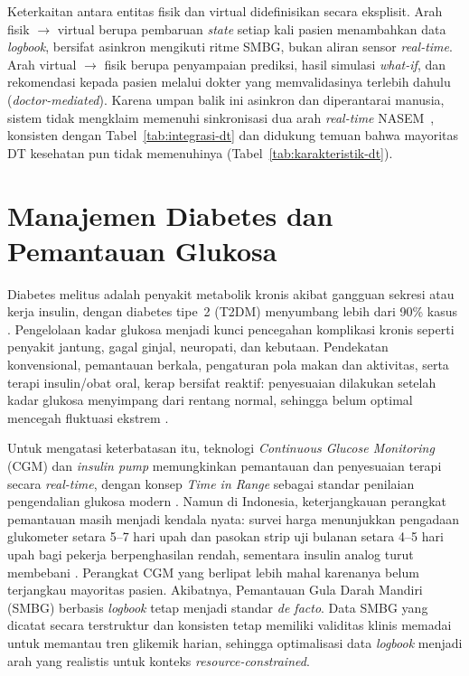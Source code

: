Keterkaitan antara entitas fisik dan virtual didefinisikan secara eksplisit. Arah fisik $\rightarrow$ virtual berupa pembaruan \emph{state} setiap kali pasien menambahkan data \emph{logbook}, bersifat asinkron mengikuti ritme SMBG, bukan aliran sensor \emph{real-time}. Arah virtual $\rightarrow$ fisik berupa penyampaian prediksi, hasil simulasi \emph{what-if}, dan rekomendasi kepada pasien melalui dokter yang memvalidasinya terlebih dahulu (\emph{doctor-mediated}). Karena umpan balik ini asinkron dan diperantarai manusia, sistem tidak mengklaim memenuhi sinkronisasi dua arah \emph{real-time} NASEM~\autocite{nasem2024}, konsisten dengan Tabel~\ref{tab:integrasi-dt} dan didukung temuan bahwa mayoritas DT kesehatan pun tidak memenuhinya (Tabel~\ref{tab:karakteristik-dt}).

\section{Manajemen Diabetes dan Pemantauan Glukosa}
Diabetes melitus adalah penyakit metabolik kronis akibat gangguan sekresi atau kerja insulin, dengan diabetes tipe~2 (T2DM) menyumbang lebih dari 90\% kasus \autocite{who2023}. Pengelolaan kadar glukosa menjadi kunci pencegahan komplikasi kronis seperti penyakit jantung, gagal ginjal, neuropati, dan kebutaan. Pendekatan konvensional, pemantauan berkala, pengaturan pola makan dan aktivitas, serta terapi insulin/obat oral, kerap bersifat reaktif: penyesuaian dilakukan setelah kadar glukosa menyimpang dari rentang normal, sehingga belum optimal mencegah fluktuasi ekstrem \autocite{alkaff2021}.

Untuk mengatasi keterbatasan itu, teknologi \emph{Continuous Glucose Monitoring} (CGM) dan \emph{insulin pump} memungkinkan pemantauan dan penyesuaian terapi secara \emph{real-time}, dengan konsep \emph{Time in Range} sebagai standar penilaian pengendalian glukosa modern \autocite{battelino2019}. Namun di Indonesia, keterjangkauan perangkat pemantauan masih menjadi kendala nyata: survei harga menunjukkan pengadaan glukometer setara 5--7 hari upah dan pasokan strip uji bulanan setara 4--5 hari upah bagi pekerja berpenghasilan rendah, sementara insulin analog turut membebani \autocite{ramadaniati2024}. Perangkat CGM yang berlipat lebih mahal karenanya belum terjangkau mayoritas pasien. Akibatnya, Pemantauan Gula Darah Mandiri (SMBG) berbasis \emph{logbook} tetap menjadi standar \emph{de facto}. Data SMBG yang dicatat secara terstruktur dan konsisten tetap memiliki validitas klinis memadai untuk memantau tren glikemik harian, sehingga optimalisasi data \emph{logbook} menjadi arah yang realistis untuk konteks \emph{resource-constrained}.

